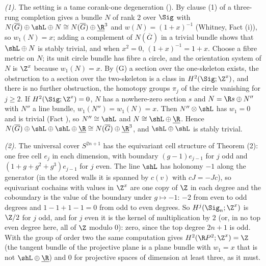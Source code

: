 \emph{(1).} The setting is a tame corank-one degeneration (). By clause (1) of  a three-rung completion gives a bundle $N$ of rank $2$ over $\Sig$ with $N(\overline G) \oplus \shL \oplus N \cong N(\overline G) \oplus \underline{\R}^{3}$ and $w(N) = (1 + x)^{-1}$ (Whitney, Fact (i)), so $w_{1}(N) = x$; adding a complement of $N(\overline G)$ in a trivial bundle shows that $\shL \oplus N$ is stably trivial, and when $x^{2} = 0$, $(1 + x)^{-1} = 1 + x$. Choose a fibre metric on $N$; its unit circle bundle has fibre a circle, and the orientation system of $N$ is $\Z^{x}$ because $w_{1}(N) = x$. By (G) a section over the one-skeleton exists, the obstruction to a section over the two-skeleton is a class in $H^{2}(\Sig; \Z^{x})$, and there is no further obstruction, the homotopy groups $\pi_{j}$ of the circle vanishing for $j \geq 2$. If $H^{2}(\Sig; \Z^{x}) = 0$, $N$ has a nowhere-zero section $s$ and $N = \R s \oplus N''$ with $N''$ a line bundle, $w_{1}(N'') = w_{1}(N) = x$. Then $N'' \otimes \shL$ has $w_{1} = 0$ and is trivial (Fact ), so $N'' \cong \shL$ and $N \cong \shL \oplus \underline{\R}$. Hence $N(\overline G) \oplus \shL \oplus \shL \oplus \underline{\R} \cong N(\overline G) \oplus \underline{\R}^{3}$, and $\shL \oplus \shL$ is stably trivial.

\emph{(2).} The universal cover $S^{2n+1}$ has the equivariant cell structure of Theorem (2): one free cell $e_{j}$ in each dimension, with boundary $(g - 1)e_{j-1}$ for $j$ odd and $(1 + g + g^{2} + g^{3})e_{j-1}$ for $j$ even. The line $\shL$ has holonomy $-1$ along the generator (in the stored walls it is spanned by $c(v)$ with $cJ = -Jc$), so equivariant cochains with values in $\Z^{x}$ are one copy of $\Z$ in each degree and the coboundary is the value of the boundary under $g \mapsto -1$: $-2$ from even to odd degrees and $1 - 1 + 1 - 1 = 0$ from odd to even degrees. So $H^{j}(\Sig_{n}; \Z^{x})$ is $\Z/2$ for $j$ odd, and for $j$ even it is the kernel of multiplication by $2$ (or, in no top even degree here, all of $\Z$ modulo $0$): zero, since the top degree $2n + 1$ is odd. With the group of order two the same computation gives $H^{2}(\R P^{2}; \Z^{x}) = \Z$ (the tangent bundle of the projective plane is a plane bundle with $w_{1} = x$ that is not $\shL \oplus \underline{\R}$) and $0$ for projective spaces of dimension at least three, as it must.


